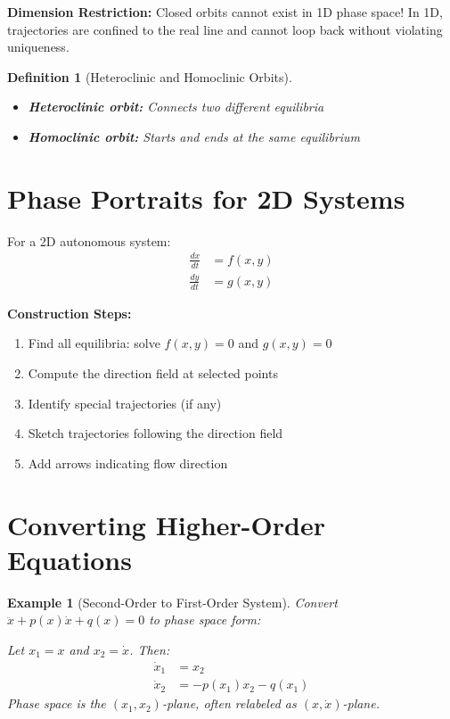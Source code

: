\documentclass[12pt]{article}
\newtheorem{definition}{Definition}
\newtheorem{example}{Example}
\begin{document}
\begin{insight}
\textbf{Dimension Restriction:} Closed orbits cannot exist in 1D phase space! In 1D, trajectories are confined to the real line and cannot loop back without violating uniqueness.
\end{insight}

\begin{definition}[Heteroclinic and Homoclinic Orbits]
\begin{itemize}
    \item \textbf{Heteroclinic orbit:} Connects two different equilibria
    \item \textbf{Homoclinic orbit:} Starts and ends at the same equilibrium
\end{itemize}
\end{definition}

\section{Phase Portraits for 2D Systems}

For a 2D autonomous system:
\begin{align}
\frac{dx}{dt} &= f(x, y) \\
\frac{dy}{dt} &= g(x, y)
\end{align}

\begin{keypoint}
\textbf{Construction Steps:}
\begin{enumerate}
    \item Find all equilibria: solve $f(x,y) = 0$ and $g(x,y) = 0$
    \item Compute the direction field at selected points
    \item Identify special trajectories (if any)
    \item Sketch trajectories following the direction field
    \item Add arrows indicating flow direction
\end{enumerate}
\end{keypoint}

\section{Converting Higher-Order Equations}

\begin{example}[Second-Order to First-Order System]
Convert $\ddot{x} + p(x)\dot{x} + q(x) = 0$ to phase space form:

Let $x_1 = x$ and $x_2 = \dot{x}$. Then:
\begin{align}
\dot{x}_1 &= x_2 \\
\dot{x}_2 &= -p(x_1)x_2 - q(x_1)
\end{align}
Phase space is the $(x_1, x_2)$-plane, often relabeled as $(x, \dot{x})$-plane.
\end{example}
\end{document}

